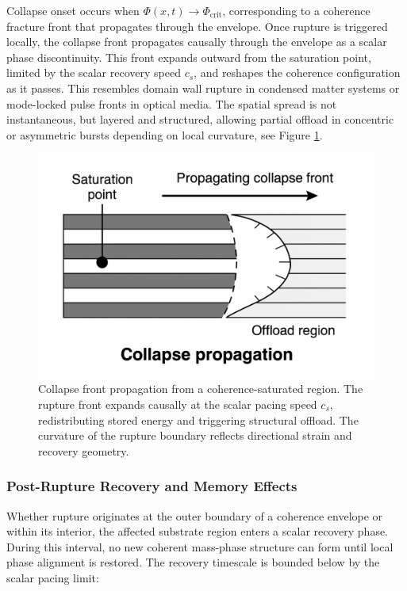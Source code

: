 \documentclass[entropy,article,submit,pdftex,moreauthors]{Definitions/mdpi}
\begin{document}
Collapse onset occurs when $\Phi(x,t) \to \Phi_{\text{crit}}$, corresponding to a coherence fracture front that propagates through the envelope. Once rupture is triggered locally, the collapse front propagates causally through the envelope as a scalar phase discontinuity. This front expands outward from the saturation point, limited by the scalar recovery speed $c_s$, and reshapes the coherence configuration as it passes. This resembles domain wall rupture in condensed matter systems or mode-locked pulse fronts in optical media. The spatial spread is not instantaneous, but layered and structured, allowing partial offload in concentric or asymmetric bursts depending on local curvature, see Figure \ref{fig:collapse_front}.

\begin{figure}[H]
  \centering
  \includegraphics[width=0.75\linewidth]{figures/collapse.pdf}
  \caption{Collapse front propagation from a coherence-saturated region. The rupture front expands causally at the scalar pacing speed $c_s$, redistributing stored energy and triggering structural offload. The curvature of the rupture boundary reflects directional strain and recovery geometry.}
  \label{fig:collapse_front}
\end{figure}

\subsubsection{Post-Rupture Recovery and Memory Effects}

Whether rupture originates at the outer boundary of a coherence envelope or within its interior, the affected substrate region enters a scalar recovery phase. During this interval, no new coherent mass-phase structure can form until local phase alignment is restored. The recovery timescale is bounded below by the scalar pacing limit:
\end{document}

